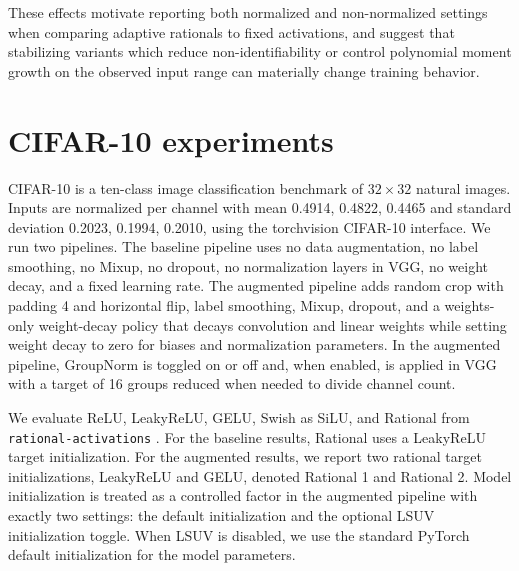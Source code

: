 \documentclass{article}
\theoremstyle{plain}
\theoremstyle{definition}
\theoremstyle{remark}
\begin{document}
These effects motivate reporting both normalized and non-normalized settings when comparing adaptive rationals to fixed activations, and suggest that stabilizing variants which reduce non-identifiability or control polynomial moment growth on the observed input range can materially change training behavior.


\section{CIFAR-10 experiments}
\label{app:CIFAR-10}

CIFAR-10 \cite{krizhevsky2009learning} is a ten-class image classification benchmark of $32\times 32$ natural images. Inputs are normalized per channel with mean 0.4914, 0.4822, 0.4465 and standard deviation 0.2023, 0.1994, 0.2010, using the torchvision CIFAR-10 interface. We run two pipelines. The baseline pipeline uses no data augmentation, no label smoothing, no Mixup, no dropout, no normalization layers in VGG, no weight decay, and a fixed learning rate. The augmented pipeline adds random crop with padding 4 and horizontal flip, label smoothing, Mixup, dropout, and a weights-only weight-decay policy that decays convolution and linear weights while setting weight decay to zero for biases and normalization parameters. In the augmented pipeline, GroupNorm is toggled on or off and, when enabled, is applied in VGG with a target of 16 groups reduced when needed to divide channel count.

We evaluate ReLU, LeakyReLU, GELU, Swish as SiLU, and Rational from \texttt{rational-activations} \cite{delfosse2020rationals}. For the baseline results, Rational uses a LeakyReLU target initialization. For the augmented results, we report two rational target initializations, LeakyReLU and GELU, denoted Rational 1 and Rational 2. Model initialization is treated as a controlled factor in the augmented pipeline with exactly two settings: the default initialization and the optional LSUV initialization toggle. When LSUV is disabled, we use the standard PyTorch default initialization for the model parameters.
\end{document}
